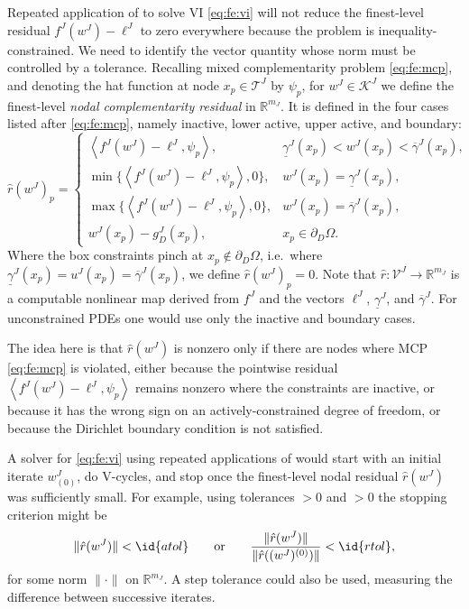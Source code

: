 \documentclass[letterpaper,final,12pt,reqno]{amsart}
\theoremstyle{cstyle}
\theoremstyle{cstyle*}
\theoremstyle{dstyle}
\numberwithin{equation}{section}
\numberwithin{figure}{section}
\numberwithin{table}{section}
\numberwithin{theorem}{section}
\newcommand{\RR}{\mathbb{R}}
\newcommand{\ip}[2]{\left<#1,#2\right>}
\begin{document}
Repeated application of  to solve VI \eqref{eq:fe:vi} will not reduce the finest-level residual $f^J(w^J) - \ell^J$ to zero everywhere because the problem is inequality-constrained.  We need to identify the vector quantity whose norm must be controlled by a tolerance.  Recalling mixed complementarity problem \eqref{eq:fe:mcp}, and denoting the hat function at node $x_p \in \mathcal{T}^J$ by $\psi_p$, for $w^J \in \mathcal{K}^J$ we define the finest-level \emph{nodal complementarity residual} in $\RR^{m_J}$.  It is defined in the four cases listed after \ref{eq:fe:mcp}, namely inactive, lower active, upper active, and boundary:
\begin{equation}
\hat r(w^J)_p = \begin{cases}
    \ip{f^J(w^J)-\ell^J}{\psi_p}, & \underline{\gamma}^J(x_p) < w^J(x_p) < \overline{\gamma}^J(x_p), \\
    \min\{\ip{f^J(w^J)-\ell^J}{\psi_p},0\}, & w^J(x_p) = \underline{\gamma}^J(x_p), \\
    \max\{\ip{f^J(w^J)-\ell^J}{\psi_p},0\}, & w^J(x_p) = \overline{\gamma}^J(x_p), \\
    w^J(x_p) - g_D^J(x_p), & x_p \in \partial_D\Omega. \end{cases} \label{eq:cpresidual}
\end{equation}
Where the box constraints pinch at $x_p \notin \partial_D\Omega$, i.e.~where $\underline{\gamma}^J(x_p)=u^J(x_p)=\overline{\gamma}^J(x_p)$, we define $\hat r(w^J)_p=0$.  Note that $\hat r:\mathcal{V}^J \to \RR^{m_J}$ is a computable nonlinear map derived from $f^J$ and the vectors $\ell^J$, $\underline{\gamma}^J$, and $\overline{\gamma}^J$.  For unconstrained PDEs one would use only the inactive and boundary cases.

The idea here is that $\hat r(w^J)$ is nonzero only if there are nodes where MCP \eqref{eq:fe:mcp} is violated, either because the pointwise residual $\ip{f^J(w^J)-\ell^J}{\psi_p}$ remains nonzero where the constraints are inactive, or because it has the wrong sign on an actively-constrained degree of freedom, or because the Dirichlet boundary condition is not satisfied.

A solver for \eqref{eq:fe:vi} using repeated applications of  would start with an initial iterate $w_{(0)}^J$, do V-cycles, and stop once the finest-level nodal residual $\hat r(w^J)$ was sufficiently small.  For example, using tolerances $>0$ and $>0$ the stopping criterion might be
\begin{equation}
\|\hat r(w^J)\| < \id{atol} \qquad \text{or} \qquad \frac{\|\hat r(w^J)\|}{\|\hat r((w^J)^{(0)})\|} < \id{rtol},
\end{equation}
for some norm $\|\cdot\|$ on $\RR^{m_J}$.  A step tolerance could also be used, measuring the difference between successive iterates.
\end{document}
